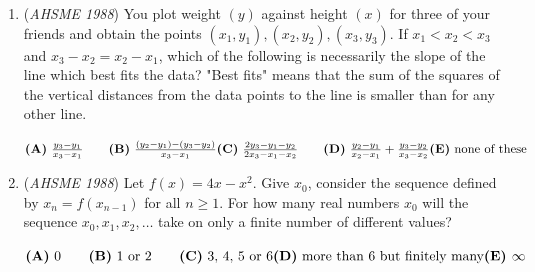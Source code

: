 \begin{enumerate}
	\item (\textit{AHSME 1988}) You plot weight $(y)$ against height $(x)$ for three of your friends and obtain the points 
$(x_{1},y_{1}), (x_{2},y_{2}), (x_{3},y_{3})$. If $x_{1} < x_{2} < x_{3}$ and $x_{3} - x_{2} = x_{2} - x_{1}$, 
which of the following is necessarily the slope of the line which best fits the data? 
"Best fits" means that the sum of the squares of the vertical distances from the data points to the line is smaller than for any other line.


 $\textbf{(A)}\ \frac{y_{3}-y_{1}}{x_{3}-x_{1}}\qquad \textbf{(B)}\ \frac{(y_{2}-y_{1})-(y_{3}-y_{2})}{x_{3}-x_{1}}\qquad\\ \textbf{(C)}\ \frac{2y_{3}-y_{1}-y_{2}}{2x_{3}-x_{1}-x_{2}}\qquad \textbf{(D)}\ \frac{y_{2}-y_{1}}{x_{2}-x_{1}}+\frac{y_{3}-y_{2}}{x_{3}-x_{2}}\qquad\\ \textbf{(E)}\ \text{none of these}$


	\item (\textit{AHSME 1988}) Let $f(x) = 4x - x^{2}$. Give $x_{0}$, consider the sequence defined by $x_{n} = f(x_{n-1})$ for all $n \ge 1$. 
For how many real numbers $x_{0}$ will the sequence $x_{0}, x_{1}, x_{2}, \ldots$ take on only a finite number of different values?


 $\textbf{(A)}\ \text{0}\qquad \textbf{(B)}\ \text{1 or 2}\qquad \textbf{(C)}\ \text{3, 4, 5 or 6}\qquad\\ \textbf{(D)}\ \text{more than 6 but finitely many}\qquad\\ \textbf{(E) }\infty$


\end{enumerate}